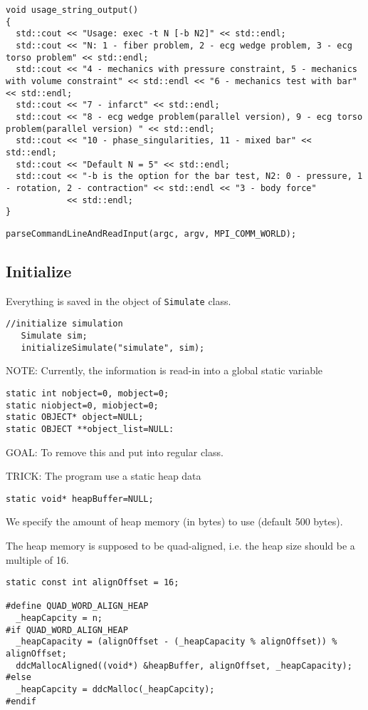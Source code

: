 {\small 
\begin{verbatim}
void usage_string_output()
{
  std::cout << "Usage: exec -t N [-b N2]" << std::endl;
  std::cout << "N: 1 - fiber problem, 2 - ecg wedge problem, 3 - ecg torso problem" << std::endl;
  std::cout << "4 - mechanics with pressure constraint, 5 - mechanics with volume constraint" << std::endl << "6 - mechanics test with bar" << std::endl;
  std::cout << "7 - infarct" << std::endl;
  std::cout << "8 - ecg wedge problem(parallel version), 9 - ecg torso problem(parallel version) " << std::endl;
  std::cout << "10 - phase_singularities, 11 - mixed bar" << std::endl;
  std::cout << "Default N = 5" << std::endl;
  std::cout << "-b is the option for the bar test, N2: 0 - pressure, 1 - rotation, 2 - contraction" << std::endl << "3 - body force"
            << std::endl;
}
\end{verbatim}
}

\begin{verbatim}
parseCommandLineAndReadInput(argc, argv, MPI_COMM_WORLD);

\end{verbatim}

\subsection{Initialize}
\label{sec:EP_initialize}

Everything is saved in the object of  \verb!Simulate! class.
\begin{verbatim}
//initialize simulation   
   Simulate sim;
   initializeSimulate("simulate", sim);
\end{verbatim}

NOTE: Currently, the information is read-in into a global static variable
\begin{verbatim}
static int nobject=0, mobject=0;
static niobject=0, miobject=0;
static OBJECT* object=NULL;
static OBJECT **object_list=NULL:
\end{verbatim}
GOAL: To remove this and put into regular class.


TRICK: The program use a static heap data
\begin{verbatim}
static void* heapBuffer=NULL;
\end{verbatim}
We specify the amount of heap memory (in bytes) to use (default 500 bytes).

The heap memory is supposed to be quad-aligned, i.e. the heap size should be a
multiple of 16.
\begin{verbatim}
static const int alignOffset = 16;

#define QUAD_WORD_ALIGN_HEAP
  _heapCapcity = n;
#if QUAD_WORD_ALIGN_HEAP
  _heapCapacity = (alignOffset - (_heapCapacity % alignOffset)) % alignOffset;
  ddcMallocAligned((void*) &heapBuffer, alignOffset, _heapCapacity);
#else
  _heapCapcity = ddcMalloc(_heapCapcity);
#endif
\end{verbatim}

